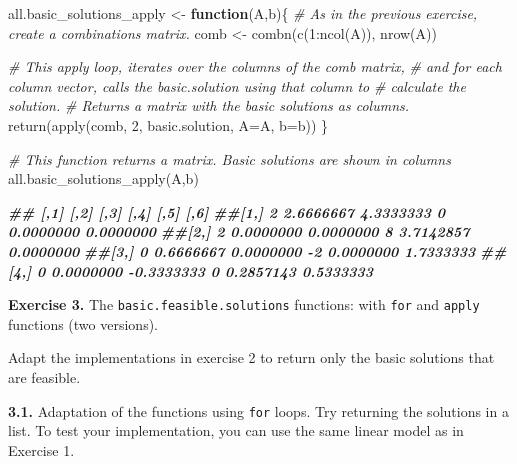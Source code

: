 \documentclass[
]{article}
\newenvironment{Shaded}{\begin{snugshade}}{\end{snugshade}}
\newcommand{\AttributeTok}[1]{\textcolor[rgb]{0.77,0.63,0.00}{#1}}
\newcommand{\CommentTok}[1]{\textcolor[rgb]{0.56,0.35,0.01}{\textit{#1}}}
\newcommand{\ControlFlowTok}[1]{\textcolor[rgb]{0.13,0.29,0.53}{\textbf{#1}}}
\newcommand{\DecValTok}[1]{\textcolor[rgb]{0.00,0.00,0.81}{#1}}
\newcommand{\DocumentationTok}[1]{\textcolor[rgb]{0.56,0.35,0.01}{\textbf{\textit{#1}}}}
\newcommand{\FunctionTok}[1]{\textcolor[rgb]{0.00,0.00,0.00}{#1}}
\newcommand{\NormalTok}[1]{#1}
\newcommand{\OtherTok}[1]{\textcolor[rgb]{0.56,0.35,0.01}{#1}}
\newcommand{\SpecialCharTok}[1]{\textcolor[rgb]{0.00,0.00,0.00}{#1}}
\begin{document}
\begin{Shaded}
\begin{Highlighting}[]
\NormalTok{all.basic\_solutions\_apply }\OtherTok{\textless{}{-}} \ControlFlowTok{function}\NormalTok{(A,b)\{}
  \CommentTok{\# As in the previous exercise, create a combinations matrix.}
\NormalTok{  comb }\OtherTok{\textless{}{-}} \FunctionTok{combn}\NormalTok{(}\FunctionTok{c}\NormalTok{(}\DecValTok{1}\SpecialCharTok{:}\FunctionTok{ncol}\NormalTok{(A)), }\FunctionTok{nrow}\NormalTok{(A))}
  
  \CommentTok{\# This apply loop, iterates over the columns of the comb matrix,}
  \CommentTok{\# and for each column vector, calls the basic.solution using that column to }
  \CommentTok{\# calculate the solution.}
  \CommentTok{\# Returns a matrix with the basic solutions as columns.}
  \FunctionTok{return}\NormalTok{(}\FunctionTok{apply}\NormalTok{(comb, }\DecValTok{2}\NormalTok{, basic.solution, }\AttributeTok{A=}\NormalTok{A, }\AttributeTok{b=}\NormalTok{b))}
\NormalTok{\} }

\CommentTok{\# This function returns a matrix. Basic solutions are shown in columns}
\FunctionTok{all.basic\_solutions\_apply}\NormalTok{(A,b) }

\DocumentationTok{\#\#    [,1]      [,2]       [,3] [,4]      [,5]      [,6]}
\DocumentationTok{\#\#[1,]    2 2.6666667  4.3333333    0 0.0000000 0.0000000}
\DocumentationTok{\#\#[2,]    2 0.0000000  0.0000000    8 3.7142857 0.0000000}
\DocumentationTok{\#\#[3,]    0 0.6666667  0.0000000   {-}2 0.0000000 1.7333333}
\DocumentationTok{\#\#[4,]    0 0.0000000 {-}0.3333333    0 0.2857143 0.5333333}
\end{Highlighting}
\end{Shaded}

\textbf{Exercise 3.} The \texttt{basic.feasible.solutions} functions:
with \texttt{for} and \texttt{apply} functions (two versions).

Adapt the implementations in exercise 2 to return only the basic
solutions that are feasible.

\textbf{3.1.} Adaptation of the functions using \texttt{for} loops. Try
returning the solutions in a list. To test your implementation, you can
use the same linear model as in Exercise 1.
\end{document}
